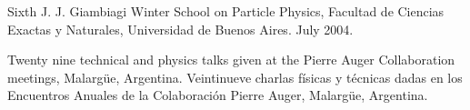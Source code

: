 \begin{etaremune}
\item {}Sixth J. J. Giambiagi Winter School on Particle Physics, Facultad de Ciencias Exactas y Naturales, Universidad de Buenos Aires. July 2004.

\item {} 
\ifeng
Twenty nine technical and physics talks given at the Pierre Auger Collaboration meetings, Malargüe, Argentina.
\else
Veintinueve charlas físicas y técnicas dadas en los Encuentros Anuales de la Colaboración Pierre Auger, Malargüe, Argentina.
\fi
\end{etaremune}

